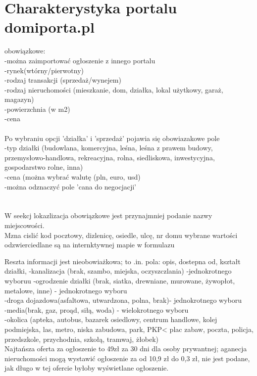 \documentclass[a4paper,12pt,twoside,openany]{report}
\begin{document}
\section{Charakterystyka portalu domiporta.pl}
obowiązkowe:\\
-można zaimportować ogłoszenie z innego portalu\\
-rynek(wtórny/pierwotny)\\
-rodzaj transakcji (sprzedaż/wynejem)\\
-rodzaj nieruchomości (mieszkanie, dom, działka, lokal użytkowy, garaż, magazyn)\\
-powierzchnia (w m2)\\
-cena\\
\\
Po wybraniu opcji 'działka' i 'sprzedaż' pojawia się obowiazakowe pole \\
-typ działki (budowlana, komercyjna, leśna, leśna z prawem budowy, przemysłowo-handlowa, rekreacyjna, rolna, siedliskowa, inwestycyjna, gospodarstwo rolne, inna)\\
-cena (można wybrać walutę (pln, euro, usd)\\
-można odznaczyć pole 'cana do negocjacji'\\
\\\\
W seekcj lokazlizacja obowiązkowe jest przynajmniej podanie nazwy miejscowości.\\
Mzna cislić kod pocztowy, dizlenicę, osiedle, ulcę, nr domu
wybrane wartości odzwierciedlane są na internktywnej mapie w formulazu

Reszta informacji jest nieobowiażkowa; to .in. pola:
opis, dostepna od, kształt działki,
-kanalizacja (brak, szambo, miejska, oczyszczlania) -jednokrotnego wyboruu
-ogrodzenie działki (brak, siatka, drewniane, murowane, żywopłot, metalowe, inne) - jednokrotnego wyboru\\
-droga dojazdowa(asfaltowa, utwardzona, polna, brak)- jednokrotnego wyboru\\
-media(brak, gaz, proąd, siłą, woda) - wielokrotnego wyboru\\
-okolica (apteka, autobus, bazarek osiedlowy, centrum handlowe, kolej podmiejska, las, metro, niska zabudowa, park, PKP< plac zabaw, poczta, policja, przedszkole, przychodnia, szkołą, tramwaj, żłobek)\\

Najtańsza oferta za ogłoszenie to 49zł za 30 dni dla osoby prywantnej; aganecja nieruchomości mogą wystawić ogłoszenie za od 10,9 zł do 0,3 zł, nie jest podane, jak długo w tej ofercie byłoby wyświetlane ogłoszenie.
\end{document}
